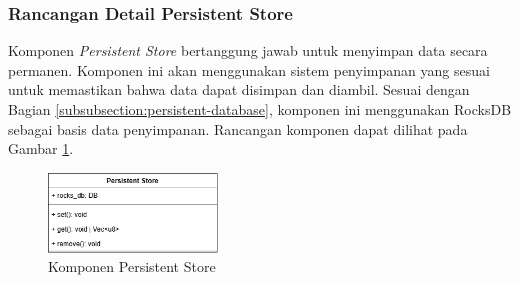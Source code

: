 \subsubsection{Rancangan Detail Persistent Store}
\label{subsubsection:detail-persistent-store}

Komponen \textit{Persistent Store} bertanggung jawab untuk menyimpan data secara permanen. Komponen ini akan menggunakan sistem penyimpanan yang sesuai untuk memastikan bahwa data dapat disimpan dan diambil. Sesuai dengan Bagian \ref{subsubsection:persistent-database}, komponen ini menggunakan RocksDB sebagai basis data penyimpanan. Rancangan komponen dapat dilihat pada Gambar \ref{fig:persistent-store-component}.

\begin{figure}[ht]
    \centering
    \includegraphics[width=0.4\textwidth]{resources/chapter-3/persistent-store-component.png}
    \caption{Komponen Persistent Store}
    \label{fig:persistent-store-component}
\end{figure}